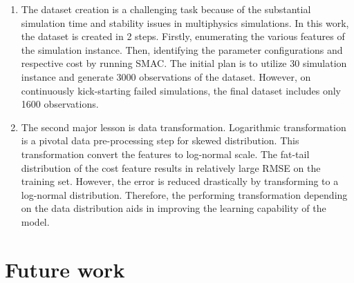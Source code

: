 \begin{enumerate}
\item The dataset creation is a challenging task because of the substantial simulation time and stability issues in multiphysics simulations. In this work, the dataset is created in 2 steps. Firstly, enumerating the various features of the simulation instance. Then, identifying the parameter configurations and respective cost by running SMAC. The initial plan is to utilize 30 simulation instance and generate 3000 observations of the dataset. However, on continuously kick-starting failed simulations, the final dataset includes only 1600 observations.

\item The second major lesson is data transformation. Logarithmic transformation is a pivotal data pre-processing step for skewed distribution.  This transformation convert the features to log-normal scale. The fat-tail distribution of the cost feature results in relatively large RMSE on the training set. However, the error is reduced drastically by transforming to a log-normal distribution. Therefore, the performing transformation depending on the data distribution aids in improving the learning capability of the model. 



\end{enumerate}

\section{Future work}

